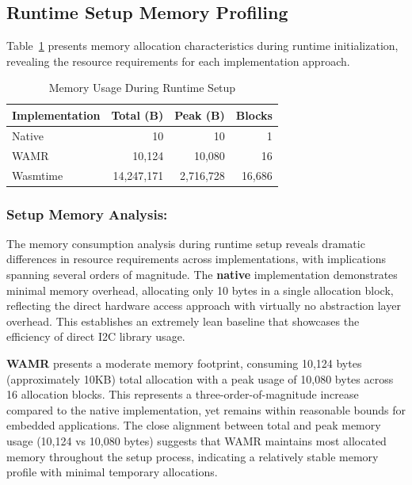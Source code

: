 \subsection{Runtime Setup Memory Profiling}
\label{subsec:memory-setup}

Table~\ref{tab:memory-setup} presents memory allocation characteristics during runtime initialization, revealing the resource requirements for each implementation approach.

\begin{table}[htbp]
    \centering
    \caption{Memory Usage During Runtime Setup}
    \label{tab:memory-setup}
    \begin{tabular}{lrrr}
        \toprule
        \textbf{Implementation} & \textbf{Total (B)} & \textbf{Peak (B)} & \textbf{Blocks} \\
        \midrule
        Native        & 10          & 10        & 1 \\
        WAMR          & 10,124      & 10,080    & 16 \\
        Wasmtime      & 14,247,171  & 2,716,728 & 16,686 \\
        \bottomrule
    \end{tabular}
\end{table}

\subsubsection{Setup Memory Analysis:}
The memory consumption analysis during runtime setup reveals dramatic differences in resource requirements across implementations, with implications spanning several orders of magnitude. The \textbf{native }implementation demonstrates minimal memory overhead, allocating only 10 bytes in a single allocation block, reflecting the direct hardware access approach with virtually no abstraction layer overhead. This establishes an extremely lean baseline that showcases the efficiency of direct I2C library usage.

\textbf{WAMR} presents a moderate memory footprint, consuming 10,124 bytes (approximately 10KB) total allocation with a peak usage of 10,080 bytes across 16 allocation blocks. This represents a three-order-of-magnitude increase compared to the native implementation, yet remains within reasonable bounds for embedded applications. The close alignment between total and peak memory usage (10,124 vs 10,080 bytes) suggests that WAMR maintains most allocated memory throughout the setup process, indicating a relatively stable memory profile with minimal temporary allocations.


